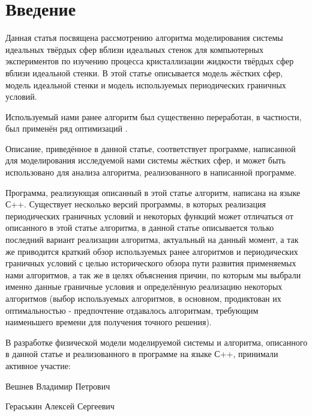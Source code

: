 \documentclass[a4paper]{article}
\begin{document}

\tableofcontents
\pagebreak

\section{Введение}

Данная статья посвящена рассмотрению алгоритма моделирования системы идеальных твёрдых сфер вблизи идеальных стенок для компьютерных экспериментов по изучению процесса кристаллизации жидкости твёрдых сфер вблизи идеальной стенки. В этой статье описывается модель жёстких сфер, модель идеальной стенки и модель используемых периодических граничных условий.

Используемый нами ранее алгоритм \cite{Veshnev_Nurlygayanov_Cristalization_of_hard_spheres_near_the_hard_wall_ru_2011} был существенно переработан, в частности, был применён ряд оптимизаций \cite{Miller_Luding_Event_driven_molecular_dynamics_in_parallel} \cite{Rapaport_The_Event_Driven_Approach_to_N_Body_Simulation} \cite{Belkin_MMD_2006}.

Описание, приведённое в данной статье, соответствует программе, написанной для моделирования исследуемой нами системы жёстких сфер, и может быть использовано для анализа алгоритма, реализованного в написанной программе.

Программа, реализующая описанный в этой статье алгоритм, написана на языке С++. Существует несколько версий программы, в которых реализация периодических граничных условий и некоторых функций может отличаться от описанного в этой статье алгоритма, в данной статье описывается только последний вариант реализации алгоритма, актуальный на данный момент, а так же приводится краткий обзор используемых ранее алгоритмов и периодических граничных условий с целью исторического обзора пути развития применяемых нами алгоритмов, а так же в целях объяснения причин, по которым мы выбрали именно данные граничные условия и определённую реализацию некоторых алгоритмов (выбор используемых алгоритмов, в основном, продиктован их оптимальностью - предпочтение отдавалось алгоритмам, требующим наименьшего времени для получения точного решения).

В разработке физической модели моделируемой системы и алгоритма, описанного в данной статье и реализованного в программе на языке С++, принимали активное участие:

Вешнев Владимир Петрович

Гераськин Алексей Сергеевич
\end{document}
